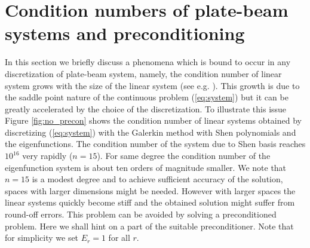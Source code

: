 \documentclass{marine_2015}
\begin{document}
\section{Condition numbers of plate-beam systems and preconditioning}
\label{sec:lbb}
In this section we briefly discuss a phenomena which is bound to occur in any
discretization of plate-beam system, namely, the condition number of linear system 
grows with the size of the linear system (see e.g.
\cite{benzi}). This growth is due to the saddle point nature of the continuous
problem (\ref{eq:system}) but it can be greatly accelerated by the choice of the
discretization. To illustrate this issue Figure \ref{fig:no_precon} shows the condition 
number of linear systems obtained by discretizing (\ref{eq:system}) with the
Galerkin method with Shen polynomials and the eigenfunctions. The condition
number of the system due to Shen basis reaches $10^{16}$ very rapidly ($n=15$). For 
same degree the condition number of the eigenfunction system is about ten orders of 
magnitude smaller. We note that $n=15$ is a modest degree and to achieve
sufficient accuracy of the solution, spaces with larger dimensions might be
needed. However with larger spaces the linear systems quickly become stiff and
the obtained solution might suffer from round-off errors. This problem can be
avoided by solving a preconditioned problem. Here we shall hint on a part of the
suitable preconditioner. Note that for simplicity we set $E_r=1$ for all $r$.
\end{document}
